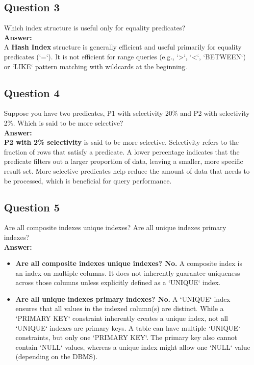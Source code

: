 \documentclass{article}
\begin{document}
\subsection*{Question 3}

Which index structure is useful only for equality predicates?\\

\textbf{Answer:}\\

A \textbf{Hash Index} structure is generally efficient and useful primarily for equality predicates (`=`). It is not efficient for range queries (e.g., `>`, `<`, `BETWEEN`) or `LIKE` pattern matching with wildcards at the beginning.\\

\subsection*{Question 4}

Suppose you have two predicates, P1 with selectivity 20\% and P2 with selectivity 2\%. Which is said to be more selective?\\

\textbf{Answer:}\\

\textbf{P2 with 2\% selectivity} is said to be more selective. Selectivity refers to the fraction of rows that satisfy a predicate. A lower percentage indicates that the predicate filters out a larger proportion of data, leaving a smaller, more specific result set. More selective predicates help reduce the amount of data that needs to be processed, which is beneficial for query performance.\\

\subsection*{Question 5}

Are all composite indexes unique indexes? Are all unique indexes primary indexes?\\

\textbf{Answer:}\\

\begin{itemize}
    \item \textbf{Are all composite indexes unique indexes? No.} A composite index is an index on multiple columns. It does not inherently guarantee uniqueness across those columns unless explicitly defined as a `UNIQUE` index.
    \item \textbf{Are all unique indexes primary indexes? No.} A `UNIQUE` index ensures that all values in the indexed column(s) are distinct. While a `PRIMARY KEY` constraint inherently creates a unique index, not all `UNIQUE` indexes are primary keys. A table can have multiple `UNIQUE` constraints, but only one `PRIMARY KEY`. The primary key also cannot contain `NULL` values, whereas a unique index might allow one `NULL` value (depending on the DBMS).
\end{itemize}
\end{document}
